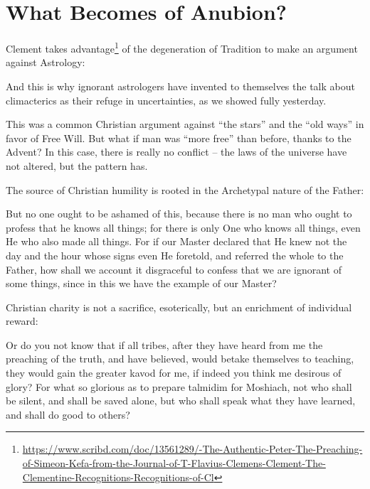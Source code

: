 \section{What Becomes of Anubion?}


Clement takes advantage\footnote{\url{https://www.scribd.com/doc/13561289/-The-Authentic-Peter-The-Preaching-of-Simeon-Kefa-from-the-Journal-of-T-Flavius-Clemens-Clement-The-Clementine-Recognitions-Recognitions-of-Cl}} of the degeneration of Tradition to make an argument against Astrology:

\begin{quotex}
And this is why ignorant astrologers have invented to themselves the talk about climacterics as their refuge in uncertainties, as we showed fully yesterday.
\end{quotex}


This was a common Christian argument against ``the stars'' and the ``old ways'' in favor of Free Will. But what if man was ``more free'' than before, thanks to the Advent? In this case, there is really no conflict -- the laws of the universe have not altered, but the pattern has.

The source of Christian humility is rooted in the Archetypal nature of the Father:

\begin{quotex}
But no one ought to be ashamed of this, because there is no man who ought to profess that he knows all things; for there is only One who knows all things, even He who also made all things. For if our Master declared that He knew not the day and the hour whose signs even He foretold, and referred the whole to the Father, how shall we account it disgraceful to confess that we are ignorant of some things, since in this we have the example of our Master?
\end{quotex}


Christian charity is not a sacrifice, esoterically, but an enrichment of individual reward:

\begin{quotex}
Or do you not know that if all tribes, after they have heard from me the preaching of the truth, and have believed, would betake themselves to teaching, they would gain the greater kavod for me, if indeed you think me desirous of glory? For what so glorious as to prepare talmidim for Moshiach, not who shall be silent, and shall be saved alone, but who shall speak what they have learned, and shall do good to others?
\end{quotex}


